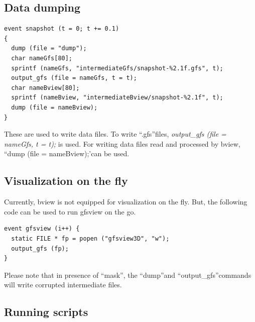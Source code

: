 \documentclass[]{article}
\begin{document}
\subsection{Data dumping}
\begin{verbatim}
event snapshot (t = 0; t += 0.1)
{
  dump (file = "dump");
  char nameGfs[80];
  sprintf (nameGfs, "intermediateGfs/snapshot-%2.1f.gfs", t);
  output_gfs (file = nameGfs, t = t);
  char nameBview[80];
  sprintf (nameBview, "intermediateBview/snapshot-%2.1f", t);
  dump (file = nameBview);
}
\end{verbatim}
These are used to write data files. To write \textquotedblleft.gfs\textquotedblright files, \textit{output\_gfs (file = nameGfs, t = t);} is used. For writing data files read and processed by bview, \textquotedblleft dump (file = nameBview);\textquoteright can be used.
\subsection{Visualization on the fly}
Currently, bview is not equipped for visualization on the fly. But, the following code can be used to run gfsview on the go. 
\begin{verbatim}
event gfsview (i++) {
  static FILE * fp = popen ("gfsview3D", "w");
  output_gfs (fp);
}
\end{verbatim}
Please note that in presence of \textquotedblleft mask\textquotedblright, the \textquotedblleft dump\textquotedblright and \textquotedblleft output\_gfs\textquotedblright commands will write corrupted intermediate files.
\subsection{Running scripts}
\end{document}
